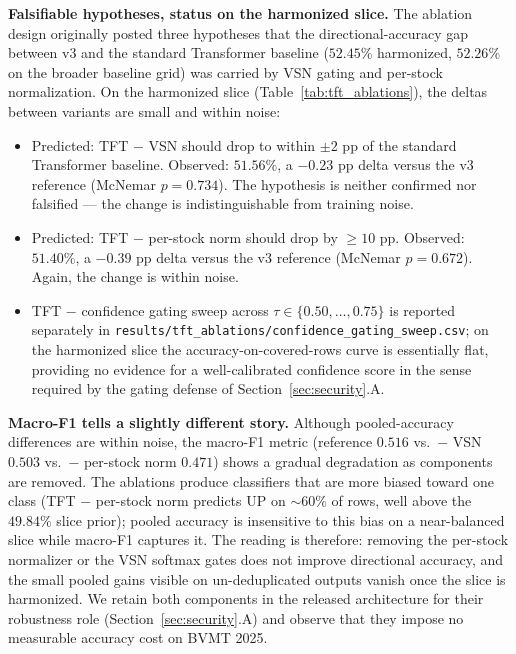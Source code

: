 \documentclass[conference]{IEEEtran}
\begin{document}
\textbf{Falsifiable hypotheses, status on the harmonized slice.} The ablation design originally posted three hypotheses that the directional-accuracy gap between v3 and the standard Transformer baseline ($52.45\%$ harmonized, $52.26\%$ on the broader baseline grid) was carried by VSN gating and per-stock normalization. On the harmonized slice (Table~\ref{tab:tft_ablations}), the deltas between variants are small and within noise:
\begin{itemize}
\item Predicted: TFT $-$ VSN should drop to within $\pm 2$ pp of the standard Transformer baseline. Observed: $51.56\%$, a $-0.23$ pp delta versus the v3 reference (McNemar $p = 0.734$). The hypothesis is neither confirmed nor falsified --- the change is indistinguishable from training noise.
\item Predicted: TFT $-$ per-stock norm should drop by $\geq 10$ pp. Observed: $51.40\%$, a $-0.39$ pp delta versus the v3 reference (McNemar $p = 0.672$). Again, the change is within noise.
\item TFT $-$ confidence gating sweep across $\tau \in \{0.50, \ldots, 0.75\}$ is reported separately in \texttt{results/tft\_ablations/confidence\_gating\_sweep.csv}; on the harmonized slice the accuracy-on-covered-rows curve is essentially flat, providing no evidence for a well-calibrated confidence score in the sense required by the gating defense of Section~\ref{sec:security}.A.
\end{itemize}

\textbf{Macro-F1 tells a slightly different story.} Although pooled-accuracy differences are within noise, the macro-F1 metric (reference $0.516$ vs.\ $-$ VSN $0.503$ vs.\ $-$ per-stock norm $0.471$) shows a gradual degradation as components are removed. The ablations produce classifiers that are more biased toward one class (TFT $-$ per-stock norm predicts UP on $\sim 60\%$ of rows, well above the $49.84\%$ slice prior); pooled accuracy is insensitive to this bias on a near-balanced slice while macro-F1 captures it. The reading is therefore: removing the per-stock normalizer or the VSN softmax gates does not improve directional accuracy, and the small pooled gains visible on un-deduplicated outputs vanish once the slice is harmonized. We retain both components in the released architecture for their robustness role (Section~\ref{sec:security}.A) and observe that they impose no measurable accuracy cost on BVMT 2025.
\end{document}
